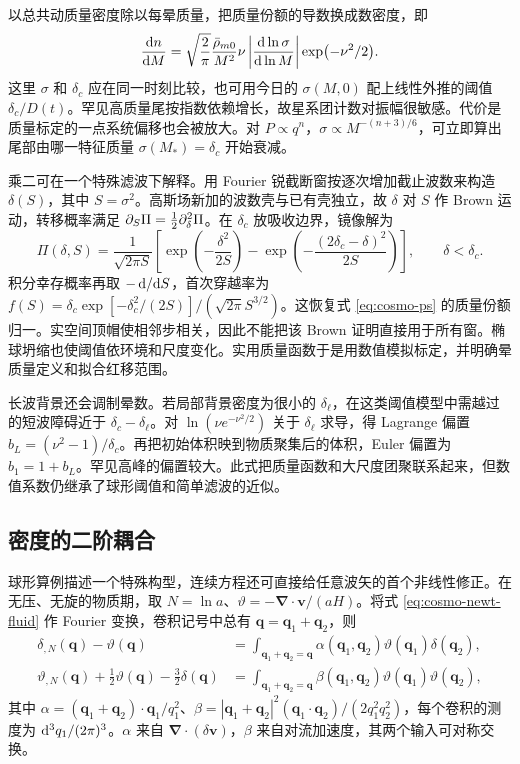 以总共动质量密度除以每晕质量，把质量份额的导数换成数密度，即
\begin{equation}\label{eq:cosmo-ps}
 \frac{\dd n}{\dd M}
 =\sqrt{\frac2\pi}\frac{\bar\rho_{m0}}{M^2}
     \nu\left|\frac{\dd\ln\sigma}{\dd\ln M}\right|
              \exp(-\nu^2/2).
\end{equation}
这里 $\sigma$ 和 $\delta_c$ 应在同一时刻比较，也可用今日的 $\sigma(M,0)$ 配上线性外推的阈值 $\delta_c/D(t)$。罕见高质量尾按指数依赖增长，故星系团计数对振幅很敏感。代价是质量标定的一点系统偏移也会被放大。对 $P\propto q^n$，$\sigma\propto M^{-(n+3)/6}$，可立即算出尾部由哪一特征质量 $\sigma(M_*)=\delta_c$ 开始衰减。

乘二可在一个特殊滤波下解释。用 Fourier 锐截断窗按逐次增加截止波数来构造 $\delta(S)$，其中 $S=\sigma^2$。高斯场新加的波数壳与已有壳独立，故 $\delta$ 对 $S$ 作 Brown 运动，转移概率满足 $\partial_S\Pi=\frac12\partial_\delta^2\Pi$。在 $\delta_c$ 放吸收边界，镜像解为
\[
 \Pi(\delta,S)=\frac{1}{\sqrt{2\pi S}}
  \left[\exp\!\left(-\frac{\delta^2}{2S}\right)
       -\exp\!\left(-\frac{(2\delta_c-\delta)^2}{2S}\right)\right],
       \qquad\delta<\delta_c .
\]
积分幸存概率再取 $-\,\dd/\dd S$，首次穿越率为 $f(S)=\delta_c\exp[-\delta_c^2/(2S)]/(\sqrt{2\pi}S^{3/2})$。这恢复式 \eqref{eq:cosmo-ps} 的质量份额归一。实空间顶帽使相邻步相关，因此不能把该 Brown 证明直接用于所有窗。椭球坍缩也使阈值依环境和尺度变化。实用质量函数于是用数值模拟标定，并明确晕质量定义和拟合红移范围。

长波背景还会调制晕数。若局部背景密度为很小的 $\delta_\ell$，在这类阈值模型中需越过的短波障碍近于 $\delta_c-\delta_\ell$。对 $\ln(\nu e^{-\nu^2/2})$ 关于 $\delta_\ell$ 求导，得 Lagrange 偏置 $b_L=(\nu^2-1)/\delta_c$。再把初始体积映到物质聚集后的体积，Euler 偏置为 $b_1=1+b_L$。罕见高峰的偏置较大。此式把质量函数和大尺度团聚联系起来，但数值系数仍继承了球形阈值和简单滤波的近似。

\subsection{密度的二阶耦合}

球形算例描述一个特殊构型，连续方程还可直接给任意波矢的首个非线性修正。在无压、无旋的物质期，取 $N=\ln a$、$\vartheta=-\bm\nabla\cdot\bm v/(aH)$。将式 \eqref{eq:cosmo-newt-fluid} 作 Fourier 变换，卷积记号中总有 $\bm q=\bm q_1+\bm q_2$，则
\begin{align*}
 \delta_{,N}(\bm q)-\vartheta(\bm q)
   &=\int_{\bm q_1+\bm q_2=\bm q}
        \alpha(\bm q_1,\bm q_2)\vartheta(\bm q_1)\delta(\bm q_2),\\
 \vartheta_{,N}(\bm q)+\frac12\vartheta(\bm q)-\frac32\delta(\bm q)
   &=\int_{\bm q_1+\bm q_2=\bm q}
        \beta(\bm q_1,\bm q_2)\vartheta(\bm q_1)\vartheta(\bm q_2),
\end{align*}
其中 $\alpha=(\bm q_1+\bm q_2)\cdot\bm q_1/q_1^2$、$\beta=|\bm q_1+\bm q_2|^2(\bm q_1\cdot\bm q_2)/(2q_1^2q_2^2)$，每个卷积的测度为 $\dd^3q_1/(2\pi)^3$。$\alpha$ 来自 $\bm\nabla\cdot(\delta\bm v)$，$\beta$ 来自对流加速度，其两个输入可对称交换。

